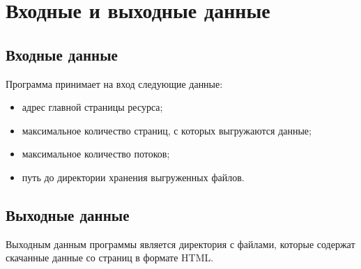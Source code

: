 \chapter{Входные и выходные данные}

\section{Входные данные}

Программа принимает на вход следующие данные:
\begin{itemize}[label=--]
    \item адрес главной страницы ресурса;
    \item максимальное количество страниц, с которых выгружаются данные;
    \item максимальное количество потоков;
    \item путь до директории хранения выгруженных файлов.
\end{itemize}

\section{Выходные данные}

Выходным данным программы является директория с файлами, которые содержат скачанные данные со страниц в формате HTML. 